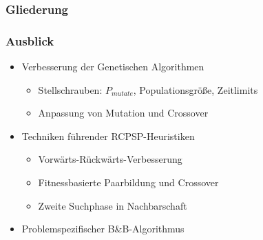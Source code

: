 \begin{frame}[noframenumbering]
\frametitle{Gliederung}
\end{frame}

\begin{frame}
\frametitle{Ausblick}
\begin{itemize}
\item Verbesserung der Genetischen Algorithmen
	\begin{itemize}
	\item Stellschrauben: $P_{mutate}$, Populationsgröße, Zeitlimits
	\item Anpassung von Mutation und Crossover\\[6mm]
	\end{itemize}
\item Techniken führender RCPSP-Heuristiken
	\begin{itemize}
	\item Vorwärts-Rückwärts-Verbesserung
	\item Fitnessbasierte Paarbildung und Crossover
	\item Zweite Suchphase in Nachbarschaft\\[6mm]
	\end{itemize}
\item Problemspezifischer B\&B-Algorithmus
\end{itemize}
\end{frame}




